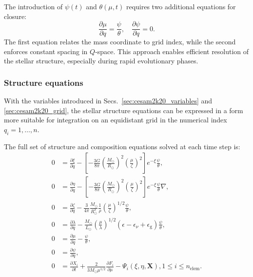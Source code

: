 \documentclass[12pt,a4paper]{article}
\newcommand{\mr}{\mathrm}
\newcommand{\pfird}[2][]{\frac{\partial#1}{\partial#2}}
\newcommand{\bvec}[1]{\boldsymbol{#1}}
\begin{document}
The introduction of $\psi(t)$ and $\theta(\mu, t)$ requires two additional equations for closure:
\begin{equation}
  \pfird[\mu]{q} = \frac{\psi}{\theta},\quad \pfird[\psi]{q} = 0.
\end{equation}
The first equation relates the mass coordinate to grid index, while the second enforces constant spacing in $Q$-space. This approach enables efficient resolution of the stellar structure, especially during rapid evolutionary phases.

\subsubsection{Structure equations}
\label{sec:cesam2k20_struct_eq}

With the variables introduced in Secs.~\ref{sec:cesam2k20_variables} and \ref{sec:cesam2k20_grid}, the stellar structure equations can be expressed in a form more suitable for integration on an equidistant grid in the numerical index $q_i = 1, \ldots, n$. 

The full set of structure and composition equations solved at each time step is:
\begin{subequations} \label{eq:cesam2k20_struct_eq}
  \begin{align}
    0 &= \pfird[\xi]{q} - \left[-\frac{3G}{8\pi}\left(\frac{M_\odot}{R_\odot}\right)^2\left(\frac{\mu}{\zeta}\right)^2\right]e^{-\xi}\frac{\psi}{\theta}, \label{eq:cesam_struct1}\\
    0 &= \pfird[\eta]{q} - \left[-\frac{3G}{8\pi}\left(\frac{M_\odot}{R_\odot}\right)^2\left(\frac{\mu}{\zeta}\right)^2\right]e^{-\xi}\frac{\psi}{\theta}\nabla, \label{eq:cesam_struct2}\\
    0 &= \pfird[\zeta]{q} - \frac{3}{4\pi}\frac{M_\odot}{R_\odot^3}\frac{1}{\rho}\left(\frac{\mu}{\zeta}\right)^{1/2}\frac{\psi}{\theta}, \label{eq:cesam_struct3}\\
    0 &= \pfird[\lambda]{q} - \frac{M_\odot}{L_\odot}\left(\frac{\mu}{\lambda}\right)^{1/2}(\epsilon  - \epsilon_\nu + \epsilon_\mr{g})\frac{\psi}{\theta}, \label{eq:cesam_struct4}\\
    0 &= \pfird[\mu]{q} - \frac{\psi}{\theta}, \label{eq:cesam_struct5}\\
    0 &= \pfird[\psi]{q}, \label{eq:cesam_struct6}\\
    0 &= \pfird[X_i]{t} + \frac{2}{3 M_\odot\mu^{1/2}}\pfird[F_i]{\mu} - \Psi_i(\xi, \eta, \bvec{X}), 1\leq i \leq n_\mr{elem}. \label{eq:cesam_struct7}
  \end{align}
\end{subequations}
\end{document}

